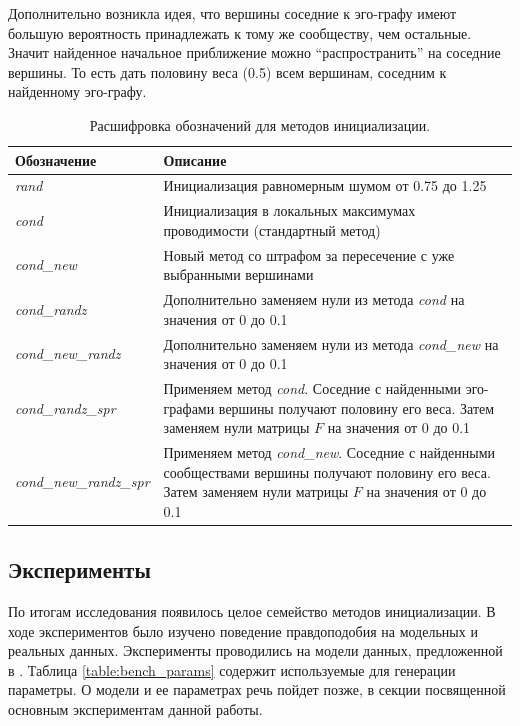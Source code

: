\documentclass{ITaSconf}
\begin{document}
	Дополнительно возникла идея, что вершины соседние к эго-графу имеют большую вероятность принадлежать к тому же сообществу, чем остальные.
	Значит найденное начальное приближение можно ``распространить'' на соседние вершины.
	То есть дать половину веса (0.5) всем вершинам, соседним к найденному эго-графу.
	\begin{center}
		\begin{table}
			\centering
			\begin{tabular}{ p{9.5em} p{38em} }
				\hline
				\hline
				\textbf{Обозначение} 		& \textbf{Описание} \\
				\hline
				\textit{rand} 				& Инициализация равномерным шумом от 0.75 до 1.25 \\
				\textit{cond} 				& Инициализация в локальных максимумах проводимости (стандартный метод) \\
				\textit{cond\_new} 			& Новый метод со штрафом за пересечение с уже выбранными вершинами \\
				\textit{cond\_randz} 		& Дополнительно заменяем нули из метода \textit{cond} на значения от 0 до 0.1 \\
				\textit{cond\_new\_randz} 	& Дополнительно заменяем нули из метода \textit{cond\_new} на значения от 0 до 0.1 \\
				\textit{cond\_randz\_spr} 	& Применяем метод \textit{cond}.
	Соседние с найденными эго-графами вершины получают половину его веса.
	Затем заменяем нули матрицы $F$ на значения от 0 до 0.1 \\
				\textit{cond\_new\_randz\_spr} & Применяем метод \textit{cond\_new}.
	Соседние с найденными сообществами вершины получают половину его веса.
	Затем заменяем нули матрицы $F$ на значения от 0 до 0.1 \\
				\hline
				\hline
			\end{tabular}
			\caption{Расшифровка обозначений для методов инициализации.}
			\label{table:init_methods}
		\end{table}
	\end{center}
	\subsection{Эксперименты} 
	
	По итогам исследования появилось целое семейство методов инициализации.
	В ходе экспериментов было изучено поведение правдоподобия на модельных и реальных данных.
	Эксперименты проводились на модели данных, предложенной в \cite{lancichinetti2009benchmarks}.
	Таблица \ref{table:bench_params} содержит используемые для генерации параметры.
	О модели и ее параметрах речь пойдет позже, в секции посвященной основным экспериментам данной работы.
	
\end{document}
